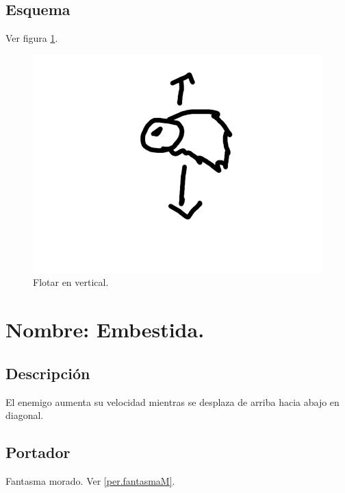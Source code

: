 		\subsection{Esquema}
		Ver figura \ref{fig:flotarV}.
		\begin{figure}
			\centering
			\includegraphics[height=0.2 \textheight]{Imagenes/flotarV}
			\caption{Flotar en vertical.}
			\label{fig:flotarV}
		\end{figure}
	\section{Nombre: Embestida.} \label{hab.embestida}
		\subsection{Descripción}
		El enemigo aumenta su velocidad mientras se desplaza de arriba hacia abajo en diagonal.
		\subsection{Portador}
		Fantasma morado. Ver \ref{per.fantasmaM}.
